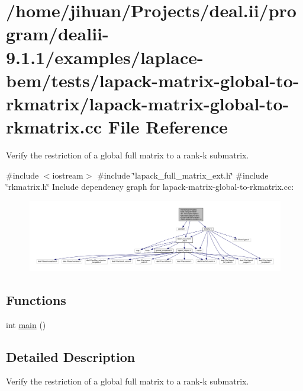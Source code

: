 \hypertarget{lapack-matrix-global-to-rkmatrix_8cc}{}\section{/home/jihuan/\+Projects/deal.ii/program/dealii-\/9.1.1/examples/laplace-\/bem/tests/lapack-\/matrix-\/global-\/to-\/rkmatrix/lapack-\/matrix-\/global-\/to-\/rkmatrix.cc File Reference}
\label{lapack-matrix-global-to-rkmatrix_8cc}


Verify the restriction of a global full matrix to a rank-\/k submatrix.  


{\ttfamily \#include $<$iostream$>$}\newline
{\ttfamily \#include \char`\"{}lapack\+\_\+full\+\_\+matrix\+\_\+ext.\+h\char`\"{}}\newline
{\ttfamily \#include \char`\"{}rkmatrix.\+h\char`\"{}}\newline
Include dependency graph for lapack-\/matrix-\/global-\/to-\/rkmatrix.cc\+:\nopagebreak
\begin{figure}[H]
\begin{center}
\leavevmode
\includegraphics[width=350pt]{lapack-matrix-global-to-rkmatrix_8cc__incl}
\end{center}
\end{figure}
\subsection*{Functions}
\begin{DoxyCompactItemize}
\item 
int \hyperlink{lapack-matrix-global-to-rkmatrix_8cc_ae66f6b31b5ad750f1fe042a706a4e3d4}{main} ()
\end{DoxyCompactItemize}


\subsection{Detailed Description}
Verify the restriction of a global full matrix to a rank-\/k submatrix. 

